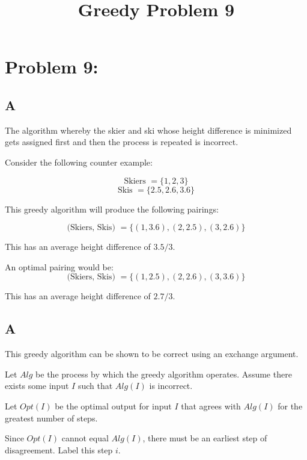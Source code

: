 \documentclass[12pt]{article}
\begin{document}
\title{Greedy Problem 9}
\renewcommand{\today}{4 September 2016}
\renewcommand{\baselinestretch}{1.5}

\maketitle

\section{Problem 9:}
\subsection{A}

The algorithm whereby the skier and ski whose height difference
is minimized gets assigned first and then the process is repeated
is incorrect.


Consider the following counter example:

\[
\text{Skiers } = \{1,2,3\}
\]
\[
\text{Skis } = \{2.5, 2.6, 3.6\}
\]

This greedy algorithm will produce the following pairings:

\[
\text{(Skiers, Skis) } = \{(1,3.6),(2,2.5),(3,2.6)\}
\]

This has an average height difference of $3.5/3$.

An optimal pairing would be:
\[
\text{(Skiers, Skis) } = \{(1,2.5),(2,2.6),(3,3.6)\}
\]

This has an average height difference of $2.7/3$.

\subsection{A}
This greedy algorithm can be shown to be correct using an
exchange argument.

Let $Alg$ be the process by which the greedy algorithm operates.
Assume there exists some input $I$ such that $Alg(I)$ is incorrect.

Let $Opt(I)$ be the optimal output for input $I$ that agrees with
$Alg(I)$ for the greatest number of steps.

Since $Opt(I)$ cannot equal $Alg(I)$, there must be an earliest
step of disagreement.  Label this step $i$.
\end{document}
